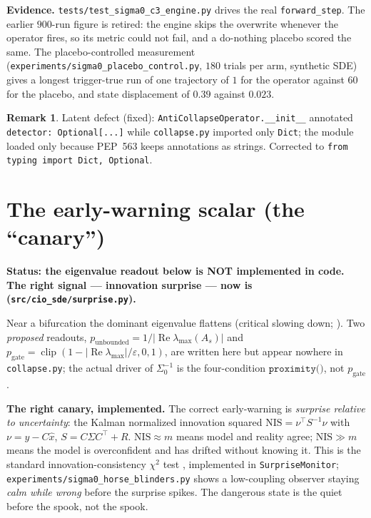\documentclass[11pt]{article}
\theoremstyle{definition}
\newtheorem{remark}{Remark}
\DeclareMathOperator*{\Real}{Re}
\begin{document}
\begin{verifybox}
\textbf{Evidence.} \texttt{tests/\allowbreak test\_sigma0\_c3\_engine.py} drives the real
\texttt{forward\_step}. The earlier $900$-run figure is retired: the engine skips the overwrite whenever the operator
fires, so its metric could not fail, and a do-nothing placebo scored the same. The placebo-controlled measurement
(\texttt{experiments/\allowbreak sigma0\_placebo\_control.py}, $180$ trials per arm, synthetic SDE) gives a longest
trigger-true run of one trajectory of $1$ for the operator against $60$ for the placebo, and state displacement of $0.39$
against $0.023$.
\end{verifybox}

\begin{remark}
Latent defect (fixed): \texttt{AntiCollapseOperator.\allowbreak\_\_init\_\_} annotated
\texttt{detector: Optional[...]} while \texttt{collapse.py} imported only
\texttt{Dict}; the module loaded only because PEP~563 keeps annotations as strings.
Corrected to \texttt{from typing import Dict, Optional}.
\end{remark}

\section{The early-warning scalar (the ``canary'')}
\begin{caveatbox}
\textbf{Status: the eigenvalue readout below is NOT implemented in code. The right
signal --- innovation surprise --- now is (\texttt{src/cio\_sde/surprise.py}).}
\end{caveatbox}
Near a bifurcation the dominant eigenvalue flattens (critical slowing down;
\cite{wissel1984,scheffer2009}). Two \emph{proposed} readouts,
$p_{\mathrm{unbounded}} = 1/|\Real\lambda_{\max}(A_s)|$ and
$p_{\mathrm{gate}} = \operatorname{clip}(1-|\Real\lambda_{\max}|/\varepsilon,0,1)$,
are written here but appear nowhere in \texttt{collapse.py}; the actual driver of
$\Sigma_0^{-1}$ is the four-condition $\texttt{proximity()}$, not $p_{\mathrm{gate}}$.

\begin{verifybox}
\textbf{The right canary, implemented.} The correct early-warning is \emph{surprise
relative to uncertainty}: the Kalman normalized innovation squared
$\mathrm{NIS}=\nu^\top S^{-1}\nu$ with $\nu=y-C\hat x$, $S=C\Sigma C^\top + R$.
$\mathrm{NIS}\approx m$ means model and reality agree; $\mathrm{NIS}\gg m$ means the
model is overconfident and has drifted without knowing it. This is the standard
innovation-consistency $\chi^2$ test \cite{barshalom2001}, implemented in
\texttt{SurpriseMonitor}; \texttt{experiments/sigma0\_horse\_blinders.py} shows a
low-coupling observer staying \emph{calm while wrong} before the surprise spikes.
The dangerous state is the quiet before the spook, not the spook.
\end{verifybox}
\end{document}
